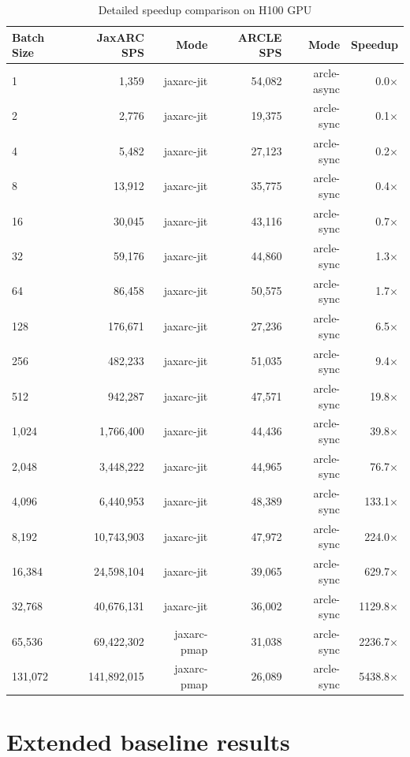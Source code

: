 \begin{table}[htbp]
\centering
\caption{Detailed speedup comparison on H100 GPU}
\label{tab:speedup_h100_gpu}
\small
\begin{tabular}{lrrrrr}
\toprule
Batch Size & JaxARC SPS & Mode & ARCLE SPS & Mode & Speedup \\
\midrule
1 & 1,359 & jaxarc-jit & 54,082 & arcle-async & 0.0$\times$ \\
2 & 2,776 & jaxarc-jit & 19,375 & arcle-sync & 0.1$\times$ \\
4 & 5,482 & jaxarc-jit & 27,123 & arcle-sync & 0.2$\times$ \\
8 & 13,912 & jaxarc-jit & 35,775 & arcle-sync & 0.4$\times$ \\
16 & 30,045 & jaxarc-jit & 43,116 & arcle-sync & 0.7$\times$ \\
32 & 59,176 & jaxarc-jit & 44,860 & arcle-sync & 1.3$\times$ \\
64 & 86,458 & jaxarc-jit & 50,575 & arcle-sync & 1.7$\times$ \\
128 & 176,671 & jaxarc-jit & 27,236 & arcle-sync & 6.5$\times$ \\
256 & 482,233 & jaxarc-jit & 51,035 & arcle-sync & 9.4$\times$ \\
512 & 942,287 & jaxarc-jit & 47,571 & arcle-sync & 19.8$\times$ \\
1,024 & 1,766,400 & jaxarc-jit & 44,436 & arcle-sync & 39.8$\times$ \\
2,048 & 3,448,222 & jaxarc-jit & 44,965 & arcle-sync & 76.7$\times$ \\
4,096 & 6,440,953 & jaxarc-jit & 48,389 & arcle-sync & 133.1$\times$ \\
8,192 & 10,743,903 & jaxarc-jit & 47,972 & arcle-sync & 224.0$\times$ \\
16,384 & 24,598,104 & jaxarc-jit & 39,065 & arcle-sync & 629.7$\times$ \\
32,768 & 40,676,131 & jaxarc-jit & 36,002 & arcle-sync & 1129.8$\times$ \\
65,536 & 69,422,302 & jaxarc-pmap & 31,038 & arcle-sync & 2236.7$\times$ \\
131,072 & 141,892,015 & jaxarc-pmap & 26,089 & arcle-sync & 5438.8$\times$ \\
\bottomrule
\end{tabular}
\end{table}

\section{Extended baseline results}
\label{app:extended_baselines}

